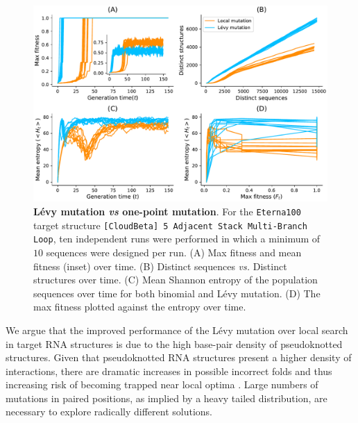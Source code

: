 \begin{figure}[t!]
	\centering
	\includegraphics[width=1.0\linewidth]{../res/images/arnaque/fig8.pdf}
	\small 
	\caption{\textbf{Lévy mutation \emph{vs} one-point mutation}. For the \texttt{Eterna100} target structure \texttt{[CloudBeta] 5 Adjacent Stack Multi-Branch Loop}, ten independent runs were performed in which a minimum of $10$ sequences were designed per run.  (A) Max fitness and mean fitness (inset) over time. (B) Distinct sequences \emph{vs.} Distinct structures over time. (C) Mean Shannon entropy of the population sequences over time for both binomial and Lévy mutation. (D) The max fitness plotted against the entropy over time.}
	\label{Fig:diversity}
	
\end{figure}

We argue that the improved performance of the Lévy mutation over local search in target \ac{RNA} structures is due to the high base-pair density of pseudoknotted structures. Given that pseudoknotted \ac{RNA} structures present a higher density of interactions, there are dramatic increases in possible incorrect folds and thus increasing risk of becoming trapped near local optima \cite{hajdin2013accurate}. Large numbers of mutations in paired positions, as implied by a heavy tailed distribution, are necessary to explore radically different solutions. 

